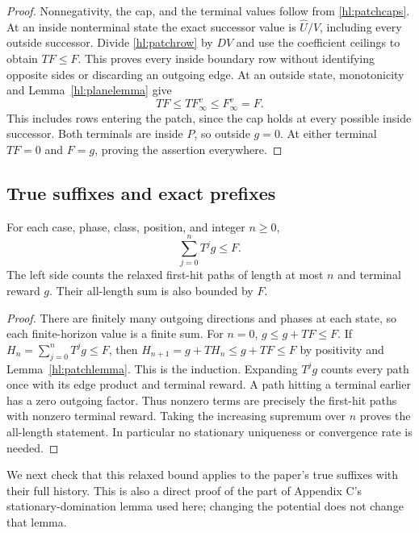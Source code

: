 \begin{proof}
Nonnegativity, the cap, and the terminal values follow from
\eqref{hl:patchcaps}.  At an inside nonterminal state the exact
successor value is $\widehat U/V$, including every outside
successor.  Divide \eqref{hl:patchrow} by $DV$ and use the
coefficient ceilings to obtain $TF\le F$.  This proves every
inside boundary row without identifying opposite sides or
discarding an outgoing edge.  At an outside state, monotonicity
and Lemma~\ref{hl:planelemma} give
\[
 TF\le TF^v_\infty\le F^v_\infty=F.
\]
This includes rows entering the patch, since the cap holds at
every possible inside successor.  Both terminals are inside $P$,
so outside $g=0$.  At either terminal $TF=0$ and $F=g$, proving
the assertion everywhere.
\end{proof}

\subsection{True suffixes and exact prefixes}

\begin{lemma}\label{hl:bellman}
For each case, phase, class, position, and integer $n\ge0$,
\[
 \sum_{j=0}^{n}T^jg\le F.
\]
The left side counts the relaxed first-hit paths of length at
most $n$ and terminal reward $g$.  Their all-length sum is also
bounded by $F$.
\end{lemma}

\begin{proof}
There are finitely many outgoing directions and phases at each
state, so each finite-horizon value is a finite sum.  For $n=0$,
$g\le g+TF\le F$.  If $H_n=\sum_{j=0}^nT^jg\le F$, then
$H_{n+1}=g+TH_n\le g+TF\le F$ by positivity and
Lemma~\ref{hl:patchlemma}.  This is the induction.  Expanding
$T^jg$ counts every path once with its edge product and terminal
reward.  A path hitting a terminal earlier has a zero outgoing
factor.  Thus nonzero terms are precisely the first-hit paths
with nonzero terminal reward.  Taking the increasing supremum
over $n$ proves the all-length statement.  In particular no
stationary uniqueness or convergence rate is needed.
\end{proof}

We next check that this relaxed bound applies to the paper's
true suffixes with their full history.  This is also a direct
proof of the part of Appendix C's stationary-domination lemma
used here; changing the potential does not change that lemma.

